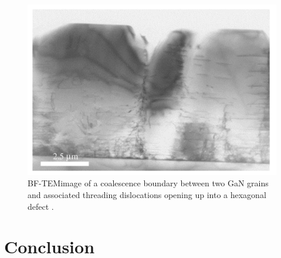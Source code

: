 \begin{figure}[h]
	\centering
	\includegraphics[width=1\textwidth]{Figs/Ch3/Datta}
	\caption[h] {BF-TEMimage of a coalescence boundary between two GaN grains and associated threading dislocations opening up into a hexagonal defect \cite{Datta2004}. }
	\label{Datta}
\end{figure}
\FloatBarrier 


\section{Conclusion}

